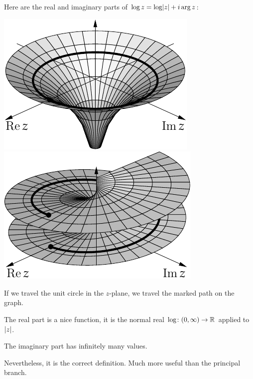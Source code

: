 \documentclass[10pt,aspectratio=169]{beamer}
\begin{document}
\begin{frame}
Here are the real and imaginary parts of
$\log z = \log \lvert {z} \rvert + i \arg z$:

\medskip

\includegraphics{../figures/logrealgraph}
\qquad
\includegraphics{../figures/arggraph2}

\pause
\medskip

If we travel the unit circle in the $z$-plane, we travel the
marked path on the graph.

\medskip
\pause

The real part is a nice function, it is the normal real $\log \colon
(0,\infty) \to {\mathbb{R}}$ applied to $\lvert {z} \rvert$.

\medskip
\pause

The imaginary part has infinitely many values.

\medskip
\pause

Nevertheless, it is the correct definition.  Much more useful than the principal branch.
\end{frame}
\end{document}
